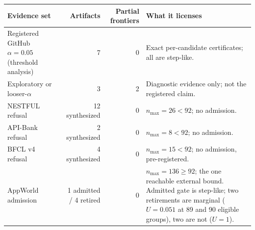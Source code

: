 \begin{tabularx}{\linewidth}{@{}lrr>{\raggedright\arraybackslash}X@{}}
\toprule
Evidence set & Artifacts & Partial frontiers & What it licenses \\
\midrule
Registered GitHub $\alpha=0.05$ (threshold analysis) & 7 & 0 & Exact per-candidate certificates; all are step-like. \\
Exploratory or looser-$\alpha$ & 3 & 2 & Diagnostic evidence only; not the registered claim. \\
NESTFUL refusal & 12 synthesized & 0 & $n_{\max}=26<92$; no admission. \\
API-Bank refusal & 2 synthesized & 0 & $n_{\max}=8<92$; no admission. \\
BFCL v4 refusal & 4 synthesized & 0 & $n_{\max}=15<92$; no admission, pre-registered. \\
AppWorld admission & 1 admitted / 4 retired & 0 & $n_{\max}=136\ge92$; the one reachable external bound. Admitted gate is step-like; two retirements are marginal ($U=0.051$ at 89 and 90 eligible groups), two are not ($U=1$). \\
\bottomrule
\end{tabularx}
